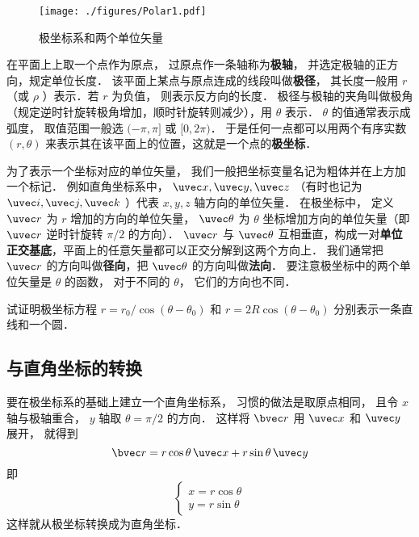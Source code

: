
\begin{figure}[ht]
\centering
\texttt{[image: ./figures/Polar1.pdf]}
\caption{极坐标系和两个单位矢量}
\end{figure}

在平面上上取一个点作为原点， 过原点作一条轴称为\textbf{极轴}， 并选定极轴的正方向，规定单位长度． 该平面上某点与原点连成的线段叫做\textbf{极径}， 其长度一般用 $r$ （或 $\rho$ ）表示．若 $r$ 为负值， 则表示反方向的长度． 极径与极轴的夹角叫做极角（规定逆时针旋转极角增加，顺时针旋转则减少），用 $\theta $ 表示． $\theta$ 的值通常表示成弧度， 取值范围一般选 $(-\pi, \pi]$ 或 $[0, 2\pi)$． 于是任何一点都可以用两个有序实数 $(r,\theta)$ 来表示其在该平面上的位置，这就是一个点的\textbf{极坐标}．

为了表示一个坐标对应的单位矢量， 我们一般把坐标变量名记为粗体并在上方加一个标记． 例如直角坐标系中， $\uvec x, \uvec y, \uvec z$ （有时也记为 $\uvec i, \uvec j, \uvec k$ ）代表 $x,y,z$ 轴方向的单位矢量． 在极坐标中， 定义 $\uvec r$ 为 $r$ 增加的方向的单位矢量， $\uvec \theta$ 为 $\theta$ 坐标增加方向的单位矢量（即 $\uvec r$ 逆时针旋转 $\pi/2$ 的方向）． $\uvec r$ 与 $\uvec \theta$ 互相垂直，构成一对\textbf{单位正交基底}，平面上的任意矢量都可以正交分解到这两个方向上． 我们通常把 $\uvec r$ 的方向叫做\textbf{径向}，把 $\uvec \theta $ 的方向叫做\textbf{法向}． 要注意极坐标中的两个单位矢量是 $\theta$ 的函数， 对于不同的 $\theta$， 它们的方向也不同．

\begin{exercise}{}
试证明极坐标方程 $r = r_0/\cos(\theta - \theta_0)$ 和 $r = 2R\cos(\theta - \theta_0)$ 分别表示一条直线和一个圆．
\end{exercise}

\subsection{与直角坐标的转换}
要在极坐标系的基础上建立一个直角坐标系， 习惯的做法是取原点相同， 且令 $x$ 轴与极轴重合， $y$ 轴取 $\theta = \pi/2$ 的方向． 这样将 $\bvec r$ 用 $\uvec x$ 和 $\uvec y$ 展开， 就得到
\begin{equation}
\bvec r = r\cos\theta\,\uvec x + r\sin\theta\,\uvec y
\end{equation}
即
\begin{equation}\label{Polar_eq2}
\begin{cases}
x = r\cos\theta\\
y = r\sin\theta
\end{cases}
\end{equation}
这样就从极坐标转换成为直角坐标．

